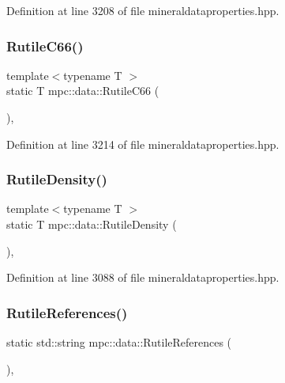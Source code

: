 Definition at line 3208 of file mineraldataproperties.\+hpp.

\mbox{\label{namespacempc_1_1data_a77467c92adbc3862d67ecd94105493dc}} 
\subsubsection{\texorpdfstring{Rutile\+C66()}{RutileC66()}}
{\footnotesize\ttfamily template$<$typename T $>$ \\
static T mpc\+::data\+::\+Rutile\+C66 (\begin{DoxyParamCaption}{ }\end{DoxyParamCaption})\hspace{0.3cm}{\ttfamily [inline]}, {\ttfamily [static]}}



Definition at line 3214 of file mineraldataproperties.\+hpp.

\mbox{\label{namespacempc_1_1data_a57ed7ae518121cb08486484a2131037f}} 
\subsubsection{\texorpdfstring{Rutile\+Density()}{RutileDensity()}}
{\footnotesize\ttfamily template$<$typename T $>$ \\
static T mpc\+::data\+::\+Rutile\+Density (\begin{DoxyParamCaption}{ }\end{DoxyParamCaption})\hspace{0.3cm}{\ttfamily [inline]}, {\ttfamily [static]}}



Definition at line 3088 of file mineraldataproperties.\+hpp.

\mbox{\label{namespacempc_1_1data_a2506808b8bb81b467d1ef68479226386}} 
\subsubsection{\texorpdfstring{Rutile\+References()}{RutileReferences()}}
{\footnotesize\ttfamily static std\+::string mpc\+::data\+::\+Rutile\+References (\begin{DoxyParamCaption}{ }\end{DoxyParamCaption})\hspace{0.3cm}{\ttfamily [inline]}, {\ttfamily [static]}}



